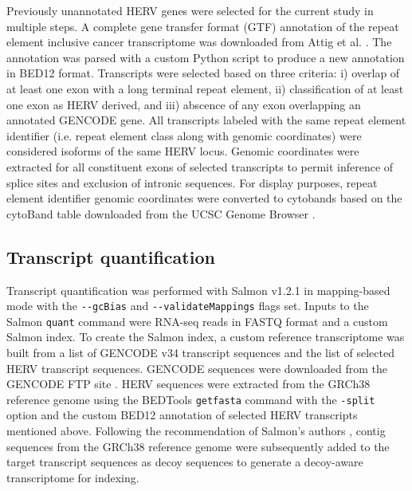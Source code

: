 Previously unannotated HERV genes were selected for the current study in multiple steps.
A complete gene transfer format (GTF) \citep{GTF} annotation of the repeat element inclusive cancer transcriptome was downloaded from Attig et al. \citep{Attig2019}.
The annotation was parsed with a custom Python script to produce a new annotation in BED12 \citep{BED12} format.
Transcripts were selected based on three criteria: i) overlap of at least one exon with a long terminal repeat element, ii) classification of at least one exon as HERV derived, and iii) abscence of any exon overlapping an annotated GENCODE gene.
All transcripts labeled with the same repeat element identifier (i.e. repeat element class along with genomic coordinates) were considered isoforms of the same HERV locus.
Genomic coordinates were extracted for all constituent exons of selected transcripts to permit inference of splice sites and exclusion of intronic sequences.
For display purposes, repeat element identifier genomic coordinates were converted to cytobands based on the cytoBand table downloaded from the UCSC Genome Browser \citep{Furey2003, Navarro2020}.

\subsection*{Transcript quantification}
Transcript quantification was performed with Salmon v1.2.1 \citep{Patro2017} in mapping-based mode with the \verb|--gcBias| and \verb|--validateMappings| flags set.
Inputs to the Salmon \verb|quant| command were RNA-seq reads in FASTQ format and a custom Salmon index.
To create the Salmon index, a custom reference transcriptome was built from a list of GENCODE v34  transcript sequences \citep{Frankish2018} and the list of selected HERV transcript sequences.
GENCODE sequences were downloaded from the GENCODE FTP site \citep{GENCODE-transcripts}.
HERV sequences were extracted from the GRCh38 reference genome \citep{ENCODE-GRCh38} using the BEDTools \verb|getfasta| command \citep{Quinlan2010} with the \verb|-split| option and the custom BED12 annotation of selected HERV transcripts mentioned above.
Following the recommendation of Salmon's authors \citep{SalmonDecoys}, contig sequences from the GRCh38 reference genome were subsequently added to the target transcript sequences as decoy sequences to generate a decoy-aware transcriptome for indexing.

